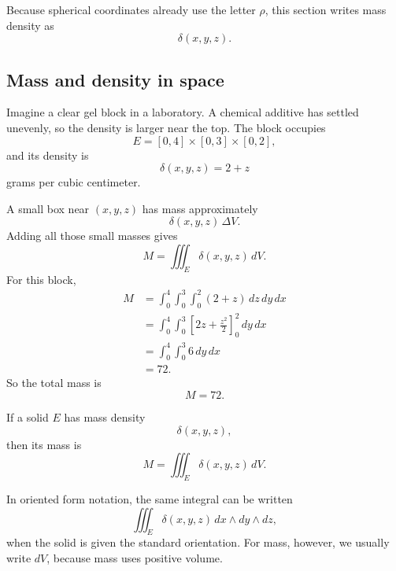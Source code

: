 Because spherical coordinates already use the letter \(\rho\), this section writes mass
density as
\[
    \delta(x,y,z).
\]

\subsection{Mass and density in space}

Imagine a clear gel block in a laboratory.  A chemical additive has settled unevenly, so
the density is larger near the top.  The block occupies
\[
    E=[0,4]\times[0,3]\times[0,2],
\]
and its density is
\[
    \delta(x,y,z)=2+z
\]
grams per cubic centimeter.

A small box near \((x,y,z)\) has mass approximately
\[
    \delta(x,y,z)\,\Delta V.
\]
Adding all those small masses gives
\[
    M=\iiint_E \delta(x,y,z)\,dV.
\]
For this block,
\[
\begin{aligned}
M
&=
\int_0^4\int_0^3\int_0^2 (2+z)\,dz\,dy\,dx\\
&=
\int_0^4\int_0^3
\left[2z+\frac{z^2}{2}\right]_0^2
\,dy\,dx\\
&=
\int_0^4\int_0^3 6\,dy\,dx\\
&=
72.
\end{aligned}
\]
So the total mass is
\[
\boxed{
    M=72.
}
\]

\begin{definition}
If a solid \(E\) has mass density
\[
    \delta(x,y,z),
\]
then its mass is
\[
\boxed{
    M=\iiint_E \delta(x,y,z)\,dV.
}
\]
\end{definition}

In oriented form notation, the same integral can be written
\[
    \iiint_E \delta(x,y,z)\,dx\wedge dy\wedge dz,
\]
when the solid is given the standard orientation.  For mass, however, we usually write
\(dV\), because mass uses positive volume.

